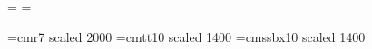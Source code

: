 \def\({\left(}%
\def\){\right)}%

\def\[{\left[}%
\def\]{\right]}%

\def\{{\left\lbrace}%
\def\}{\right\rbrace}%

\def\<{\left<}%
\def\>{\right>}%

\def\ket#1{\left|\?\sv{#1}\?\right>}%
\def\bra#1{\left<\?\sv{#1}\?\right|}%
\def\braket#1#2{\left<\?\sv{#1}\?\middle|\?\sv{#2}\?\right>}%


\prot{}
\prot{}
\prot{}

\prot{}
\prot\def\vs{\noalign{\vskip3pt}}

\prot{}

\def\unroll#1{\copy#1\vskip-\ht#1}%


\def\rotate#1#2{{\setbox0=\hbox{#1}\rlap{\kern0.5\wd0
  \dimen0=\ht0 \advance\dimen0 by -\dp0
  \raise0.5\dimen0\hbox{\special{x:gsave}\special{x:rotate #2}}}%
  \box0 \special{x:grestore}}}%


\headline={}%
\footline={\hfil}%
\def\nopagenumbers{\headline{\hfil}}%

\def\sv#1{{\mathbold=1\fam\bffam #1}}%


\def\magstep#1{%
\ifcase#1
1000\or 1200\or 1440\or 1728\or 2074\or 2488\or 2986\or 3583\or 4300\or 5160%
\fi\relax
}%



\font\titlefontrm=cmr7 scaled 2000
\font\titlefonttt=cmtt10 scaled 1400
\font\titlefontbf=cmssbx10 scaled 1400


